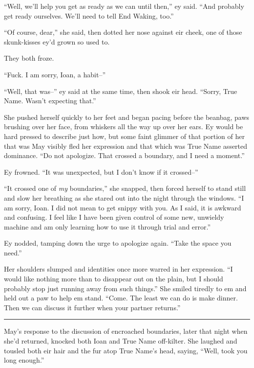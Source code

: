 ``Well, we'll help you get as ready as we can until then,'' ey said. ``And probably get ready ourselves. We'll need to tell End Waking, too.''

``Of course, dear,'' she said, then dotted her nose against eir cheek, one of those skunk-kisses ey'd grown so used to.

They both froze.

``Fuck. I am sorry, Ioan, a habit--''

``Well, that was--'' ey said at the same time, then shook eir head. ``Sorry, True Name. Wasn't expecting that.''

She pushed herself quickly to her feet and began pacing before the beanbag, paws brushing over her face, from whiskers all the way up over her ears. Ey would be hard pressed to describe just how, but some faint glimmer of that portion of her that was May visibly fled her expression and that which was True Name asserted dominance. ``Do not apologize. That crossed a boundary, and I need a moment.''

Ey frowned. ``It was unexpected, but I don't know if it crossed--''

``It crossed one of \emph{my} boundaries,'' she snapped, then forced herself to stand still and slow her breathing as she stared out into the night through the windows. ``I am sorry, Ioan. I did not mean to get snippy with you. As I said, it is awkward and confusing. I feel like I have been given control of some new, unwieldy machine and am only learning how to use it through trial and error.''

Ey nodded, tamping down the urge to apologize again. ``Take the space you need.''

Her shoulders slumped and identities once more warred in her expression. ``I would like nothing more than to disappear out on the plain, but I should probably stop just running away from such things.'' She smiled tiredly to em and held out a paw to help em stand. ``Come. The least we can do is make dinner. Then we can discuss it further when your partner returns.''

\begin{center}\rule{0.5\linewidth}{0.5pt}\end{center}

May's response to the discussion of encroached boundaries, later that night when she'd returned, knocked both Ioan and True Name off-kilter. She laughed and tousled both eir hair and the fur atop True Name's head, saying, ``Well, took you long enough.''

